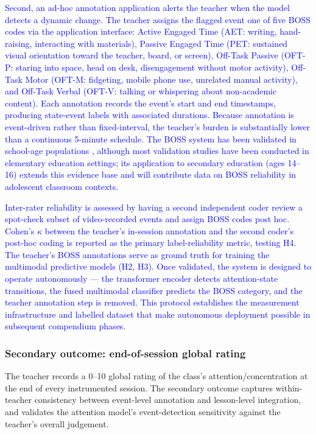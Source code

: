 \textcolor{blue}{Second, an ad-hoc annotation application alerts the teacher when the model detects a dynamic change. The teacher assigns the flagged event one of five BOSS codes via the application interface: Active Engaged Time (AET: writing, hand-raising, interacting with materials), Passive Engaged Time (PET: sustained visual orientation toward the teacher, board, or screen), Off-Task Passive (OFT-P: staring into space, head on desk, disengagement without motor activity), Off-Task Motor (OFT-M: fidgeting, mobile phone use, unrelated manual activity), and Off-Task Verbal (OFT-V: talking or whispering about non-academic content). Each annotation records the event's start and end timestamps, producing state-event labels with associated durations. Because annotation is event-driven rather than fixed-interval, the teacher's burden is substantially lower than a continuous 5-minute schedule. The BOSS system has been validated in school-age populations \parencite{Alperin2023_boss_validation}, although most validation studies have been conducted in elementary education settings; its application to secondary education (ages 14--16) extends this evidence base and will contribute data on BOSS reliability in adolescent classroom contexts.}

\textcolor{blue}{Inter-rater reliability is assessed by having a second independent coder review a spot-check subset of video-recorded events and assign BOSS codes post hoc. Cohen's $\kappa$ between the teacher's in-session annotation and the second coder's post-hoc coding is reported as the primary label-reliability metric, testing H4. The teacher's BOSS annotations serve as ground truth for training the multimodal predictive models (H2, H3). Once validated, the system is designed to operate autonomously --- the transformer encoder detects attention-state transitions, the fused multimodal classifier predicts the BOSS category, and the teacher annotation step is removed. This protocol establishes the measurement infrastructure and labelled dataset that make autonomous deployment possible in subsequent compendium phases.}

\subsubsection{Secondary outcome: end-of-session global rating}

The teacher records a 0--10 global rating of the class's attention/concentration at the end of every instrumented session. The secondary outcome captures within-teacher consistency between event-level annotation and lesson-level integration, and validates the attention model's event-detection sensitivity against the teacher's overall judgement.

